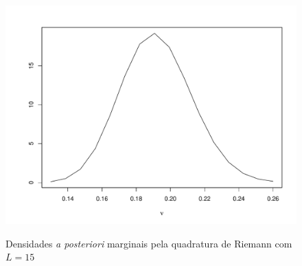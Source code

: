 \documentclass[9pt]{beamer}
\begin{document}
\begin{frame}
\begin{figure}[t]
{{			\includegraphics[scale=0.2]{dpm_nu_qr_15.pdf}}}%
	\caption{Densidades \textit{a posteriori} marginais pela quadratura de Riemann com $L = 15$}%
\end{figure}
\end{frame}
\end{document}
